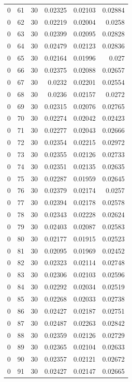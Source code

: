\begin{tabular}{rrrrrr}
0 & 61 & 30 & 0.02325 & 0.02103 & 0.02884 \\
0 & 62 & 30 & 0.02219 & 0.02004 & 0.0258 \\
0 & 63 & 30 & 0.02399 & 0.02095 & 0.02828 \\
0 & 64 & 30 & 0.02479 & 0.02123 & 0.02836 \\
0 & 65 & 30 & 0.02164 & 0.01996 & 0.027 \\
0 & 66 & 30 & 0.02375 & 0.02088 & 0.02657 \\
0 & 67 & 30 & 0.0232 & 0.02201 & 0.02554 \\
0 & 68 & 30 & 0.0236 & 0.02157 & 0.0272 \\
0 & 69 & 30 & 0.02315 & 0.02076 & 0.02765 \\
0 & 70 & 30 & 0.02274 & 0.02042 & 0.02423 \\
0 & 71 & 30 & 0.02277 & 0.02043 & 0.02666 \\
0 & 72 & 30 & 0.02354 & 0.02215 & 0.02972 \\
0 & 73 & 30 & 0.02355 & 0.02126 & 0.02733 \\
0 & 74 & 30 & 0.02351 & 0.02135 & 0.02635 \\
0 & 75 & 30 & 0.02287 & 0.01959 & 0.02645 \\
0 & 76 & 30 & 0.02379 & 0.02174 & 0.0257 \\
0 & 77 & 30 & 0.02394 & 0.02178 & 0.02578 \\
0 & 78 & 30 & 0.02343 & 0.02228 & 0.02624 \\
0 & 79 & 30 & 0.02403 & 0.02087 & 0.02583 \\
0 & 80 & 30 & 0.02177 & 0.01915 & 0.02523 \\
0 & 81 & 30 & 0.02095 & 0.01969 & 0.02452 \\
0 & 82 & 30 & 0.02323 & 0.02114 & 0.02748 \\
0 & 83 & 30 & 0.02306 & 0.02103 & 0.02596 \\
0 & 84 & 30 & 0.02292 & 0.02034 & 0.02519 \\
0 & 85 & 30 & 0.02268 & 0.02033 & 0.02738 \\
0 & 86 & 30 & 0.02427 & 0.02187 & 0.02751 \\
0 & 87 & 30 & 0.02487 & 0.02263 & 0.02842 \\
0 & 88 & 30 & 0.02359 & 0.02126 & 0.02729 \\
0 & 89 & 30 & 0.02365 & 0.02104 & 0.02633 \\
0 & 90 & 30 & 0.02357 & 0.02121 & 0.02672 \\
0 & 91 & 30 & 0.02427 & 0.02147 & 0.02665 \\

\end{tabular}
